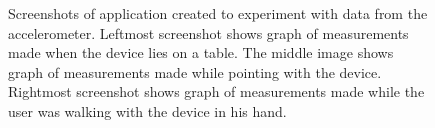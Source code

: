 \begin{figure}[!htb]%
    \centering
    \caption{Screenshots of application created to experiment with data from the accelerometer. Leftmost screenshot shows graph of measurements made when the device lies on a table. The middle image shows graph of measurements made while pointing with the device. Rightmost screenshot shows graph of measurements made while the user was walking with the device in his hand.}
    \label{fig:pointer}
\end{figure}

